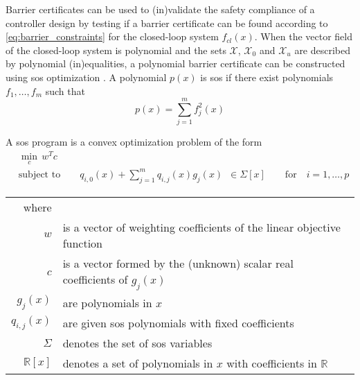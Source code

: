 Barrier certificates can be used to (in)validate the safety compliance of a controller design by testing if a barrier certificate can be found according to \autoref{eq:barrier_constraints} for the closed-loop system $f_{cl}(x)$. When the vector field of the closed-loop system is polynomial and the sets $\mathcal{X}$, $\mathcal{X}_0$ and $\mathcal{X}_u$ are described by polynomial (in)equalities, a polynomial barrier certificate can be constructed using \gls{sos} optimization \citep{bib:prajna_framework}. A polynomial $p(x)$ is \gls{sos} if there exist polynomials $f_1,\dots,f_m$ such that \citep{bib:parrilo_sdp}
\begin{equation}
p(x) = \sum_{j=1}^{m}f_j^2(x)
\end{equation}

A \gls{sos} program is a convex optimization problem of the form \citep{bib:prajna_framework,bib:sostools}
\begin{subequations}
\begin{align}
&\min_{c}\, w^Tc\\
&\text{subject to} \qquad
q_{i,0}(x) + \sum_{j=1}^{m} q_{i,j}(x)g_j(x) \,\,\,\in \Sigma[x]
\qquad \text{for}\quad
i=1,\dots, p
\end{align}
\end{subequations}
\vspace*{-4mm}
\begin{tabular}{rl}
where &\\
$w$ & is a vector of weighting coefficients of the linear objective function\\
$c$ & is a vector formed by the (unknown) scalar real coefficients of $g_j(x)$\\
$g_j(x)$ & are polynomials in $x$\\
$q_{i,j}(x)$ & are given \gls{sos} polynomials with fixed coefficients\\
$\Sigma$ & denotes the set of \gls{sos} variables\\
$\mathbb{R}[x]$ &denotes a set of polynomials in $x$ with coefficients in $\mathbb{R}$\\
\end{tabular}\\\\


